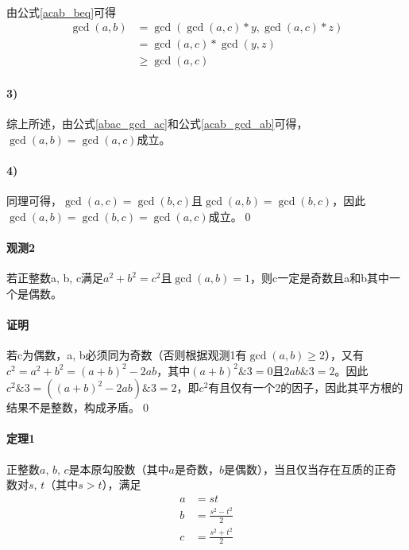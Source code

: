 \documentclass[UTF8]{ctexart}
\begin{document}
	\paragraph{}由公式\ref{acab_beq}可得
	\begin{equation}\label{acab_gcd_ab}
		\begin{aligned}
			\gcd(a,b)&=\gcd(\gcd(a,c)*y,\gcd(a,c)*z)\\
					&=\gcd(a,c)*\gcd(y,z)\\
					&{\geq}\gcd(a,c)
		\end{aligned}
	\end{equation}

	\paragraph{3)}综上所述，由公式\ref{abac_gcd_ac}和公式\ref{acab_gcd_ab}可得，$\gcd(a,b)=\gcd(a,c)$成立。

	\paragraph{4)}同理可得，$\gcd(a,c)=\gcd(b,c)$且$\gcd(a,b)=\gcd(b,c)$，因此$\gcd(a,b)=\gcd(b,c)=\gcd(a,c)$成立。\qed

	\paragraph{观测2} 若正整数a, b, c满足$a^2+b^2=c^2$且$\gcd(a,b)=1$，则c一定是奇数且a和b其中一个是偶数。
	\paragraph{证明} 若c为偶数，a, b必须同为奇数（否则根据观测1有$\gcd(a,b){\geq}2$），又有$c^2=a^2+b^2=(a+b)^2-2ab$，其中$(a+b)^2\&3=0$且$2ab\&3=2$。因此$c^2\&3=((a+b)^2-2ab)\&3=2$，即$c^2$有且仅有一个2的因子，因此其平方根的结果不是整数，构成矛盾。\qed
	\paragraph{定理1} 正整数$a$, $b$, $c$是本原勾股数（其中$a$是奇数，$b$是偶数），当且仅当存在互质的正奇数对$s$, $t$（其中$s>t$），满足
	\begin{align}
		\label{eqa}a&=st\\
		\label{eqb}b&=\frac{s^2-t^2}{2}\\
		\label{eqc}c&=\frac{s^2+t^2}{2}
	\end{align}
\end{document}
